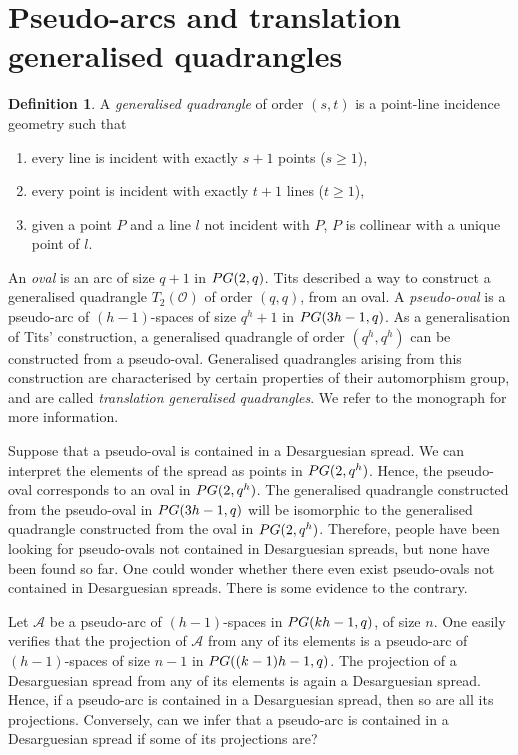 \documentclass[a4paper]{article}
\theoremstyle{definition}
\newtheorem{df}[thm]{Definition}
\newcommand{\pg}{\textnormal{PG}}
\newcommand{\ma}{\mathcal A}
\begin{document}
\section{Pseudo-arcs and translation generalised quadrangles}
 \label{SecGen}

\begin{df}
 A \emph{generalised quadrangle} of order $(s,t)$ is a point-line incidence geometry such that
 \begin{enumerate}
  \item every line is incident with exactly $s+1$ points ($s \geq 1$),
  \item every point is incident with exactly $t+1$ lines ($t \geq 1$),
  \item given a point $P$ and a line $l$ not incident with $P$, $P$ is collinear with a unique point of $l$.
 \end{enumerate}
\end{df}

An \emph{oval} is an arc of size $q+1$ in $\pg(2,q)$.
Tits described a way to construct a generalised quadrangle $T_2(\mathcal O)$ of order $(q,q)$, from an oval.
A \emph{pseudo-oval} is a pseudo-arc of $(h-1)$-spaces of size $q^h+1$ in $\pg(3h-1,q)$.
As a generalisation of Tits' construction, a generalised quadrangle of order $(q^h,q^h)$ can be constructed from a pseudo-oval.
Generalised quadrangles arising from this construction are characterised by certain properties of their automorphism group, and are called \emph{translation generalised quadrangles}.
We refer to the monograph \cite{thasthasvanmaldeghem} for more information.

Suppose that a pseudo-oval is contained in a Desarguesian spread.
We can interpret the elements of the spread as points in $\pg(2,q^h)$.
Hence, the pseudo-oval corresponds to an oval in $\pg(2,q^h)$.
The generalised quadrangle constructed from the pseudo-oval in $\pg(3h-1,q)$ will be isomorphic to the generalised quadrangle constructed from the oval in $\pg(2,q^h)$.
Therefore, people have been looking for pseudo-ovals not contained in Desarguesian spreads, but none have been found so far.
One could wonder whether there even exist pseudo-ovals not contained in Desarguesian spreads.
There is some evidence to the contrary.

Let $\ma$ be a pseudo-arc of $(h-1)$-spaces in $\pg(kh-1,q)$, of size $n$.
One easily verifies that the projection of $\ma$ from any of its elements is a pseudo-arc of $(h-1)$-spaces of size $n-1$ in $\pg((k-1)h-1,q)$.
The projection of a Desarguesian spread from any of its elements is again a Desarguesian spread.
Hence, if a pseudo-arc is contained in a Desarguesian spread, then so are all its projections.
Conversely, can we infer that a pseudo-arc is contained in a Desarguesian spread if some of its projections are?
\end{document}
